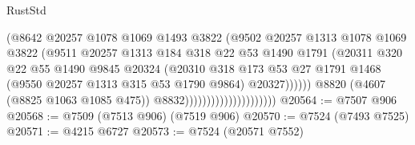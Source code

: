 \begin{lexlean}{RustStd}
\begin{coremodule}
                                                (@8642
                                                  @20257
                                                  @1078
                                                  @1069
                                                  @1493
                                                  @3822
                                                  (@9502
                                                    @20257
                                                    @1313
                                                    @1078
                                                    @1069
                                                    @3822
                                                    (@9511
                                                      @20257
                                                      @1313
                                                      @184
                                                      @318
                                                      @22
                                                      @53
                                                      @1490
                                                      @1791
                                                      (@20311
                                                        @320
                                                        @22
                                                        @55
                                                        @1490
                                                        @9845
                                                        @20324
                                                        (@20310
                                                          @318
                                                          @173
                                                          @53
                                                          @27
                                                          @1791
                                                          @1468
                                                          (@9550 @20257 @1313 @315 @53 @1790 @9864)
                                                          @20327))))))
                                              @8820
                                              (@4607 (@8825 @1063 @1085 @475))
                                              @8832)))))))))))))))))))))
@20564 := @7507 @906
@20568 := @7509 (@7513 @906) (@7519 @906)
@20570 := @7524 (@7493 @7525)
@20571 := @4215 @6727
@20573 := @7524 (@20571 @7552)

\end{coremodule}
\end{lexlean}

